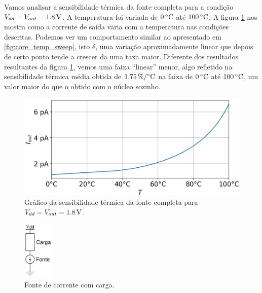 \documentclass[10pt,a4paper]{extreport}
\newcommand{\aspas}[1]{``#1''}
\newcommand{\?}{\stackrel{?}{=}}
\newcommand{\sis}[2]{\complexnum{#1}\,\si[per-mode=symbol]{#2}}
\newcommand{\mysize}{0.69}
\begin{document}
Vamos analisar a sensibilidade térmica da fonte completa para a condição $V_{dd}=V_{out}=\sis{1.8}{\volt}$. A temperatura foi variada de $\sis{0}{\celsius}$ até $\sis{100}{\celsius}$. A figura \ref{fig:mirror_temp_sweep} nos mostra como a corrente de saída varia com a temperatura nas condições descritas. Podemos ver um comportamento similar ao apresentado em \ref{fig:core_temp_sweep}, isto é, uma variação aproximadamente linear que depois de certo ponto tende a crescer da uma taxa maior. Diferente dos resultados resultantes da figura \ref{fig:mirror_temp_sweep}, vemos uma faixa \aspas{linear} menor, algo refletido na sensibilidade térmica média obtida de $\sis{1.75}{\percent\per\celsius}$ na faixa de $\sis{0}{\celsius}$ até $\sis{100}{\celsius}$, um valor maior do que o obtido com o núcleo sozinho.

\begin{figure}[htp!]
    \includegraphics[width=\mysize\linewidth]{Imagens/mirror_temp_sweep.png}
    \centering
    \caption{Gráfico da sensibilidade térmica da fonte completa para $V_{dd}=V_{out}=\sis{1.8}{\volt}$.}
    \label{fig:mirror_temp_sweep}
\end{figure}

\begin{figure}
    \centering
    \includegraphics[width=0.13\textwidth]{Imagens/loaded_sbcs.jpg}
    \caption{Fonte de corrente com carga.}
    \label{fig:loaded_sbcs}
\end{figure}
\end{document}

